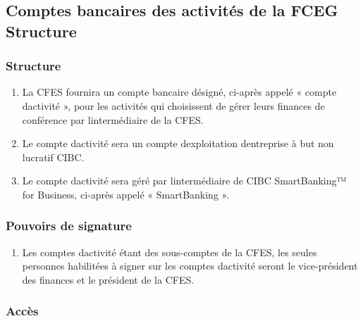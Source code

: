 \subsection{Comptes bancaires des activités de la FCEG Structure}
\label{comptes-bancaires-des-activites-de-la-fceg-structure}

\subsubsection{Structure}
\label{structure}

\begin{enumerate}
 \item
  La CFES fournira un compte bancaire désigné, ci-après appelé « compte d\textquotesingle activité », pour les activités qui choisissent de gérer leurs finances de conférence par l\textquotesingle intermédiaire de la CFES.
 \item
  Le compte d\textquotesingle activité sera un compte d\textquotesingle exploitation d\textquotesingle entreprise à but non lucratif CIBC.
 \item
  Le compte d\textquotesingle activité sera géré par l\textquotesingle intermédiaire de CIBC SmartBanking™ for Business, ci-après appelé « SmartBanking ».
\end{enumerate}

\subsubsection{Pouvoirs de signature}
\label{pouvoirs-de-signature}

\begin{enumerate}
 \item
  Les comptes d\textquotesingle activité étant des sous-comptes de la CFES, les seules personnes habilitées à signer sur les comptes d\textquotesingle activité seront le vice-président des finances et le président de la CFES.
\end{enumerate}

\subsubsection{Accès}
\label{acces}

